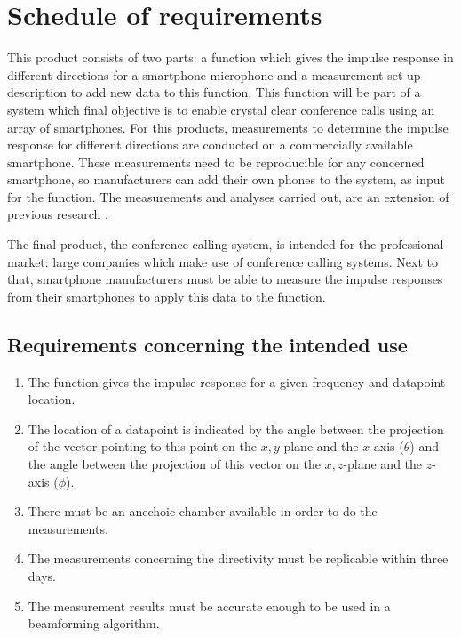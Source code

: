 \chapter{Schedule of requirements}
\label{app:requirements}
This product consists of two parts: a function which gives the impulse response in different directions for a smartphone microphone and a measurement set-up description to add new data to this function.
This function will be part of a system which final objective is to enable crystal clear conference calls using an array of smartphones.
For this products, measurements to determine the impulse response for different directions are conducted on a commercially available smartphone.
These measurements need to be reproducible for any concerned smartphone, so manufacturers can add their own phones to the system, as input for the function.
The measurements and analyses carried out, are an extension of previous research 
\cite{Gaubitch2014}. 

The final product, the conference calling system, is intended for the professional market: large companies which make use of conference calling systems.
Next to that, smartphone manufacturers must be able to measure the impulse responses from their smartphones to apply this data to the function.

\section{Requirements concerning the intended use}
\begin{enumerate}
\item The function gives the impulse response for a given frequency and datapoint location.
\item The location of a datapoint is indicated by the angle between the projection of the vector pointing to this point on the $x,y$-plane and the $x$-axis ($\theta$) and the angle between the projection of this vector on the $x,z$-plane and the $z$-axis ($\phi$).
\item There must be an anechoic chamber available in order to do the measurements. 
\item The measurements concerning the directivity must be replicable within three days. 
\item The measurement results must be accurate enough to be used in a beamforming algorithm.  
\end{enumerate}


